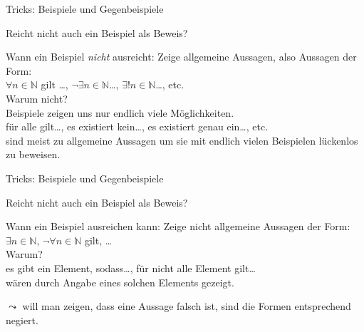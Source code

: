 \begin{frame}[fragile]{Tricks: Beispiele und Gegenbeispiele}
    \begin{alertblock}{Reicht nicht auch ein Beispiel als Beweis?}
    \end{alertblock}
    \begin{block}{Wann ein Beispiel \emph{nicht} ausreicht:}
        Zeige allgemeine Aussagen, also Aussagen der Form:\\$\forall n\in\mathbb{N}$ gilt \dots, $\neg\exists n\in\mathbb{N}$\dots, $\exists!n\in\mathbb{N}$\dots, etc.\\
        \alert{Warum nicht?}\\
        Beispiele zeigen uns nur endlich viele Möglichkeiten.\\
        \glqq für alle gilt\dots\grqq, \glqq es existiert kein\dots\grqq, \glqq es existiert genau ein\dots\grqq, etc. \\sind meist zu allgemeine Aussagen um sie mit endlich vielen Beispielen lückenlos zu beweisen.
    \end{block}
\end{frame}

\begin{frame}[fragile]{Tricks: Beispiele und Gegenbeispiele}
    \begin{alertblock}{Reicht nicht auch ein Beispiel als Beweis?}
    \end{alertblock}
    \begin{block}{Wann ein Beispiel ausreichen kann:}
        Zeige nicht allgemeine Aussagen der Form:\\
        $\exists n\in\mathbb{N}$, $\neg\forall n\in\mathbb{N}$ gilt, \dots\\
        \alert{Warum?}\\
        \glqq es gibt ein Element, sodass\dots\grqq, \glqq für nicht alle Element gilt\dots\grqq\\wären durch Angabe eines solchen Elements gezeigt.
    \end{block}
        $\leadsto$ will man zeigen, dass eine Aussage falsch ist, sind die Formen entsprechend negiert.
\end{frame}
